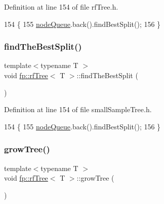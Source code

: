 Definition at line 154 of file rf\+Tree.\+h.


\begin{DoxyCode}
154                                               \{
155                     \hyperlink{classfp_1_1rfTree_af72d0a2f930fd480dfb4858885c2df23}{nodeQueue}.back().findBestSplit();
156                 \}
\end{DoxyCode}
\mbox{\label{classfp_1_1rfTree_a51da8e4a46582b26643a4ae392230e77}} 
\subsubsection{\texorpdfstring{find\+The\+Best\+Split()}{findTheBestSplit()}\hspace{0.1cm}{\footnotesize\ttfamily [2/2]}}
{\footnotesize\ttfamily template$<$typename T $>$ \\
void \hyperlink{classfp_1_1rfTree}{fp\+::rf\+Tree}$<$ T $>$\+::find\+The\+Best\+Split (\begin{DoxyParamCaption}{ }\end{DoxyParamCaption})\hspace{0.3cm}{\ttfamily [inline]}}



Definition at line 154 of file small\+Sample\+Tree.\+h.


\begin{DoxyCode}
154                                               \{
155                     \hyperlink{classfp_1_1rfTree_af72d0a2f930fd480dfb4858885c2df23}{nodeQueue}.back().findBestSplit();
156                 \}
\end{DoxyCode}
\mbox{\label{classfp_1_1rfTree_a196d6006e7e2ee0575fa40d7d4621712}} 
\subsubsection{\texorpdfstring{grow\+Tree()}{growTree()}\hspace{0.1cm}{\footnotesize\ttfamily [1/2]}}
{\footnotesize\ttfamily template$<$typename T $>$ \\
void \hyperlink{classfp_1_1rfTree}{fp\+::rf\+Tree}$<$ T $>$\+::grow\+Tree (\begin{DoxyParamCaption}{ }\end{DoxyParamCaption})\hspace{0.3cm}{\ttfamily [inline]}}




